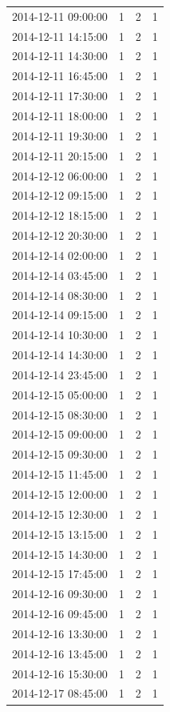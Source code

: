 \begin{tabular}{lrrr}
2014-12-11 09:00:00 & 1 & 2 & 1 \\
2014-12-11 14:15:00 & 1 & 2 & 1 \\
2014-12-11 14:30:00 & 1 & 2 & 1 \\
2014-12-11 16:45:00 & 1 & 2 & 1 \\
2014-12-11 17:30:00 & 1 & 2 & 1 \\
2014-12-11 18:00:00 & 1 & 2 & 1 \\
2014-12-11 19:30:00 & 1 & 2 & 1 \\
2014-12-11 20:15:00 & 1 & 2 & 1 \\
2014-12-12 06:00:00 & 1 & 2 & 1 \\
2014-12-12 09:15:00 & 1 & 2 & 1 \\
2014-12-12 18:15:00 & 1 & 2 & 1 \\
2014-12-12 20:30:00 & 1 & 2 & 1 \\
2014-12-14 02:00:00 & 1 & 2 & 1 \\
2014-12-14 03:45:00 & 1 & 2 & 1 \\
2014-12-14 08:30:00 & 1 & 2 & 1 \\
2014-12-14 09:15:00 & 1 & 2 & 1 \\
2014-12-14 10:30:00 & 1 & 2 & 1 \\
2014-12-14 14:30:00 & 1 & 2 & 1 \\
2014-12-14 23:45:00 & 1 & 2 & 1 \\
2014-12-15 05:00:00 & 1 & 2 & 1 \\
2014-12-15 08:30:00 & 1 & 2 & 1 \\
2014-12-15 09:00:00 & 1 & 2 & 1 \\
2014-12-15 09:30:00 & 1 & 2 & 1 \\
2014-12-15 11:45:00 & 1 & 2 & 1 \\
2014-12-15 12:00:00 & 1 & 2 & 1 \\
2014-12-15 12:30:00 & 1 & 2 & 1 \\
2014-12-15 13:15:00 & 1 & 2 & 1 \\
2014-12-15 14:30:00 & 1 & 2 & 1 \\
2014-12-15 17:45:00 & 1 & 2 & 1 \\
2014-12-16 09:30:00 & 1 & 2 & 1 \\
2014-12-16 09:45:00 & 1 & 2 & 1 \\
2014-12-16 13:30:00 & 1 & 2 & 1 \\
2014-12-16 13:45:00 & 1 & 2 & 1 \\
2014-12-16 15:30:00 & 1 & 2 & 1 \\
2014-12-17 08:45:00 & 1 & 2 & 1 \\

\end{tabular}
